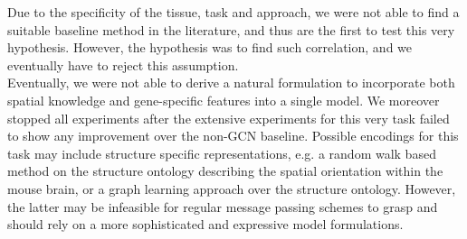 \documentclass[]{article}
\begin{document}
Due to the specificity of the tissue, task and approach, we were not able to find a suitable baseline method in the literature, and thus are the first to test this very hypothesis. However, the hypothesis was to find such correlation, and we eventually have to reject this assumption.\\

Eventually, we were not able to derive a natural formulation to incorporate both spatial knowledge and gene-specific features into a single model. We moreover stopped all experiments after the extensive experiments for this very task failed to show any improvement over the non-GCN baseline. Possible encodings for this task may include structure specific representations, e.g. a random walk based method on the structure ontology describing the spatial orientation within the mouse brain, or a graph learning approach over the structure ontology. However, the latter may be infeasible for regular message passing schemes to grasp and should rely on a more sophisticated and expressive model formulations.


\end{document}
